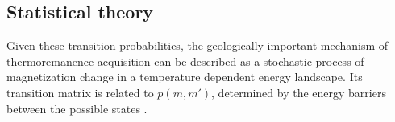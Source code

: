 \subsection{Statistical theory}
Given these transition probabilities, the geologically important mechanism of
thermoremanence acquisition can be described as a
 stochastic process of
magnetization change in a temperature dependent energy landscape.
Its transition matrix is related to $p(m,m')$, determined by the energy barriers between the possible
states \cite{Fabian:03b}.


